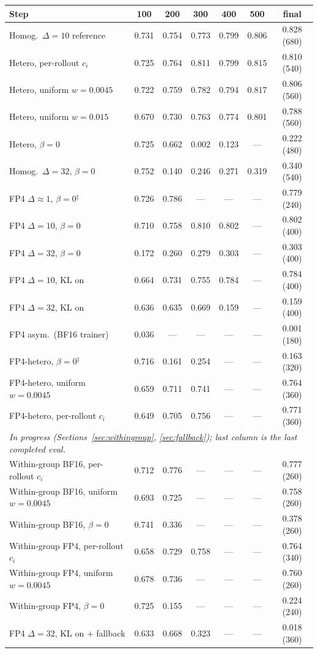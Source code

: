 \documentclass[11pt]{amsart}
\begin{document}
\begin{center}
\small
\begin{tabular}{lcccccc}
\toprule
Step & 100 & 200 & 300 & 400 & 500 & final \\
\midrule
Homog.\ $\Delta{=}10$ reference & 0.731 & 0.754 & 0.773 & 0.799 & 0.806 & 0.828 (680) \\
Hetero, per-rollout $c_i$ & 0.725 & 0.764 & 0.811 & 0.799 & 0.815 & 0.810 (540) \\
Hetero, uniform $w{=}0.0045$ & 0.722 & 0.759 & 0.782 & 0.794 & 0.817 & 0.806 (560) \\
Hetero, uniform $w{=}0.015$ & 0.670 & 0.730 & 0.763 & 0.774 & 0.801 & 0.788 (560) \\
Hetero, $\beta{=}0$ & 0.725 & 0.662 & 0.002 & 0.123 & --- & 0.222 (480) \\
Homog.\ $\Delta{=}32$, $\beta{=}0$ & 0.752 & 0.140 & 0.246 & 0.271 & 0.319 & 0.340 (540) \\
\midrule
FP4 $\Delta{\approx}1$, $\beta{=}0$$^{\ddagger}$ & 0.726 & 0.786 & --- & --- & --- & 0.779 (240) \\
FP4 $\Delta{=}10$, $\beta{=}0$ & 0.710 & 0.758 & 0.810 & 0.802 & --- & 0.802 (400) \\
FP4 $\Delta{=}32$, $\beta{=}0$ & 0.172 & 0.260 & 0.279 & 0.303 & --- & 0.303 (400) \\
FP4 $\Delta{=}10$, KL on & 0.664 & 0.731 & 0.755 & 0.784 & --- & 0.784 (400) \\
FP4 $\Delta{=}32$, KL on & 0.636 & 0.635 & 0.669 & 0.159 & --- & 0.159 (400) \\
FP4 asym.\ (BF16 trainer) & 0.036 & --- & --- & --- & --- & 0.001 (180) \\
FP4-hetero, $\beta{=}0$$^{\ddagger}$ & 0.716 & 0.161 & 0.254 & --- & --- & 0.163 (320) \\
FP4-hetero, uniform $w{=}0.0045$ & 0.659 & 0.711 & 0.741 & --- & --- & 0.764 (360) \\
FP4-hetero, per-rollout $c_i$ & 0.649 & 0.705 & 0.756 & --- & --- & 0.771 (360) \\
\midrule
\multicolumn{7}{l}{\emph{In progress (Sections~\ref{sec:withingroup},
\ref{sec:fallback}); last column is the last completed eval.}}\\
Within-group BF16, per-rollout $c_i$ & 0.712 & 0.776 & --- & --- & --- & 0.777 (260) \\
Within-group BF16, uniform $w{=}0.0045$ & 0.693 & 0.725 & --- & --- & --- & 0.758 (260) \\
Within-group BF16, $\beta{=}0$ & 0.741 & 0.336 & --- & --- & --- & 0.378 (260) \\
Within-group FP4, per-rollout $c_i$ & 0.658 & 0.729 & 0.758 & --- & --- & 0.764 (340) \\
Within-group FP4, uniform $w{=}0.0045$ & 0.678 & 0.736 & --- & --- & --- & 0.760 (260) \\
Within-group FP4, $\beta{=}0$ & 0.725 & 0.155 & --- & --- & --- & 0.224 (240) \\
FP4 $\Delta{=}32$, KL on $+$ fallback & 0.633 & 0.668 & 0.323 & --- & --- & 0.018 (360) \\
\bottomrule
\end{tabular}


\end{center}
\end{document}
